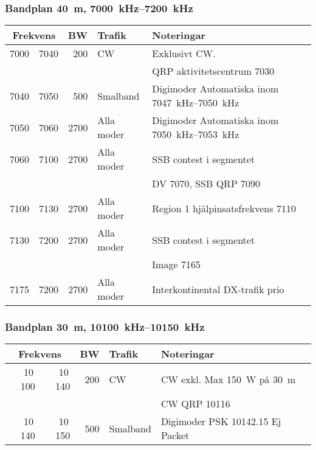 \subsubsection{Bandplan \qty{40}{\metre}, \SIrange{7000}{7200}{\kilo\hertz}}
\begin{tabular}{rrrll}
\multicolumn{2}{c}{\textbf{Frekvens}} & \textbf{BW} & \textbf{Trafik} & \textbf{Noteringar} \\ \hline

7000 & 7040 & 200  & CW         & Exklusivt CW.                                        \\
     &      &      &            & QRP aktivitetscentrum \qty{7030}{}                    \\ \hline
7040 & 7050 & 500  & Smalband   & Digimoder Automatiska inom \SIrange{7047}{7050}{\kilo\hertz} \\ \hline
7050 & 7060 & 2700 & Alla moder & Digimoder Automatiska inom \SIrange{7050}{7053}{\kilo\hertz} \\ \hline
7060 & 7100 & 2700 & Alla moder & SSB contest i segmentet                              \\
     &      &      &            & DV \num{7070}, SSB QRP \num{7090}                    \\ \hline
7100 & 7130 & 2700 & Alla moder & Region 1 hjälpinsatsfrekvens \num{7110}           \\ \hline
7130 & 7200 & 2700 & Alla moder & SSB contest i segmentet                              \\
     &      &      &            & Image \num{7165}                                     \\ \hline
7175 & 7200 & 2700 & Alla moder & Interkontinental DX-trafik prio                      \\ \hline

\end{tabular}
\subsubsection{Bandplan \qty{30}{\metre}, \SIrange{10100}{10150}{\kilo\hertz}}
\begin{tabular}{rrrll}
\multicolumn{2}{c}{\textbf{Frekvens}} & \textbf{BW} & \textbf{Trafik} & \textbf{Noteringar} \\ \hline

10\,100 & 10\,140 & 200 & CW       & CW exkl. Max \qty{150}{\watt} på \qty{30}{m} \\
        &         &     &          & CW QRP \num{10116}                     \\ \hline
10\,140 & 10\,150 & 500 & Smalband & Digimoder PSK \num{10142,15} Ej Packet \\ \hline
\end{tabular}

